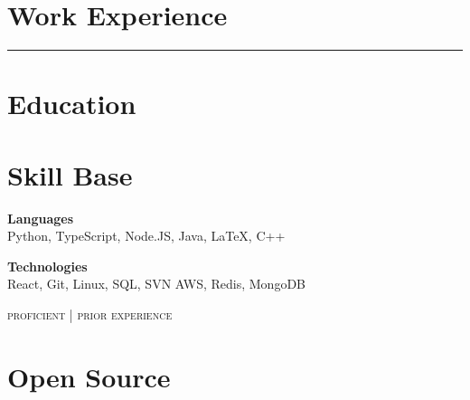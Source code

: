\documentclass{article}
\newcommand{\ruleLine}{
   	\begin{center}
  	\color{lines}
 	\rule{0.5\textwidth}{.4pt}
	\end{center}
}
\begin{document}
\begin{minipage}[t]{0.55\textwidth}

\raggedright

  \section{Work Experience}
  
  	

  	\ruleLine

  	
  	
\end{minipage}
\hfill
\begin{minipage}[t]{0.43\textwidth}

\raggedright

	\section{Education}

  	
  	
  	\vspace{8pt}

   	

\vspace{10pt}

	\section{Skill Base}
  	\textbf{Languages} \\
  	{\small
  		{\color{highlight}
			Python, TypeScript, Node.JS,
      }
		Java, LaTeX, C++
 	}

  	\vspace{5pt}

  	\textbf{Technologies} \\
  	{\small
   		{\color{highlight}
        	React, Git, Linux, SQL, SVN
      	}
      	AWS, Redis, MongoDB
  	}

  	\vspace{5pt}

  	{\hfill\raggedleft\textsc{
   		\footnotesize{
   			{\color{highlight} proficient} | 
   			prior experience
   		}
   	}}

\vspace{10pt}

	\section{Open Source}

	

  	\vspace{8pt}

  	

\vspace{10pt}
   	
\end{minipage}
\end{document}

